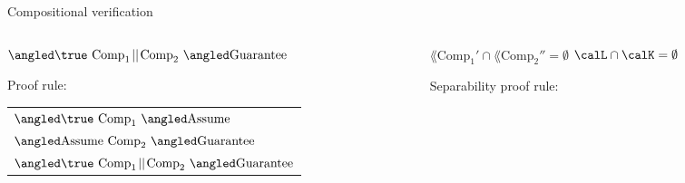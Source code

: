 \documentclass[../talk.tex]{subfiles}
\begin{document}
\begin{frame}{Compositional verification}
    \begin{overlayarea}{\slidewidth}{\slideheight}
        \begin{columns}[t,onlytextwidth]%
            \begin{column}{0.6\textwidth}%
                \(
                    \relyguarantee{\true}{\text{Comp}_1 \!\mid\mid\! \text{Comp}_2}
                    {\text{Guarantee}}
                \)

                {%
                    \vspace*{1em}

                    Proof rule:

                    \vspace*{1em}

                    \begin{tabular}{l}
                        $\relyguarantee{\true}{\text{Comp}_1}{\text{Assume}}$
                        \\
                        $\relyguarantee{\text{Assume}}{\text{Comp}_2}{\text{Guarantee}}$
                        \\
                        \cline{1-1}
                        $\relyguarantee{\true}{\text{Comp}_1 \!\mid\mid\! \text{Comp}_2 }{\text{Guarantee}}$
                    \end{tabular}
                }
            \end{column}%
            \begin{column}{0.4\textwidth}%
                {%
                    \(
                        \lang{\text{Comp}_1'} \cap \lang{\text{Comp}_2''}
                        = \emptyset
                    \)
                }
                {%
                    \(
                        \calL \cap \calK
                        = \emptyset
                    \)
                }

                {%
                    \vspace*{1em}

                    \alert{Separability} proof rule:

}
\end{column}
\end{columns}
\end{overlayarea}
\end{frame}
\end{document}
